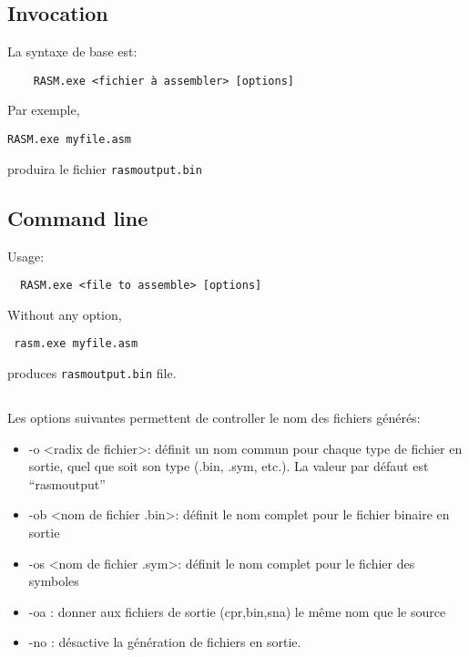 \begin{xfr}
  \subsection{Invocation}
  La syntaxe de base est:
  \begin{verbatim}
    RASM.exe <fichier à assembler> [options]
  \end{verbatim}
  Par exemple, \begin{verbatim}RASM.exe myfile.asm\end{verbatim} produira le fichier \texttt{rasmoutput.bin}
\end{xfr}

\begin{xen}
  \subsection{Command line}
  Usage:
  \begin{verbatim}
  RASM.exe <file to assemble> [options]
  \end{verbatim}

  Without any option, \begin{verbatim} rasm.exe myfile.asm \end{verbatim} produces \texttt{rasmoutput.bin} file.
\end{xen}

\subsection{}
\begin{xfr}
 Les options suivantes permettent de controller le nom des fichiers générés:
  \begin{itemize}
    \item -o \textless radix de fichier\textgreater	: définit un nom commun pour chaque type de fichier en sortie, quel que soit son type (.bin, .sym, etc.).
    La valeur par défaut est “rasmoutput” %
    \item -ob \textless nom de fichier .bin\textgreater	: définit le nom complet pour le fichier binaire en sortie
    \item -os \textless nom de fichier .sym\textgreater	: définit le nom complet pour le fichier des symboles
    \item -oa : donner aux fichiers de sortie (cpr,bin,sna) le même nom que le source
    \item -no	: désactive la génération de fichiers en sortie.
  \end{itemize}
\end{xfr}

